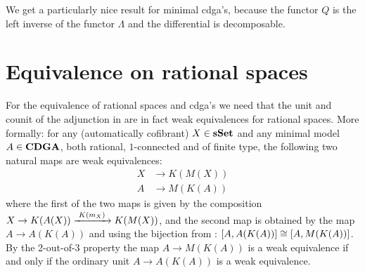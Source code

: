 We get a particularly nice result for minimal cdga's, because the functor $Q$ is the left inverse of the functor $\Lambda$ and the differential is decomposable.




\section{Equivalence on rational spaces}
For the equivalence of rational spaces and cdga's we need that the unit and counit of the adjunction in  are in fact weak equivalences for rational spaces. More formally: for any (automatically cofibrant) $X \in \mathbf{s{\mathbf{Set}}}$ and any minimal model $A \in \mathbf{CDGA}$, both rational, $1$-connected and of finite type, the following two natural maps are weak equivalences:
\begin{align*}
	X &\to K(M(X)) \\
	A &\to M(K(A))
\end{align*}
where the first of the two maps is given by the composition $X \to K(A(X)) \xrightarrow{\,\,{K(m_X)}\,\,} K(M(X))$,
and the second map is obtained by the map $A \to A(K(A))$ and using the bijection from : $[A, A(K(A))] \cong [A, M(K(A))]$. By the 2-out-of-3 property the map $A \to M(K(A))$ is a weak equivalence if and only if the ordinary unit $A \to A(K(A))$ is a weak equivalence.



